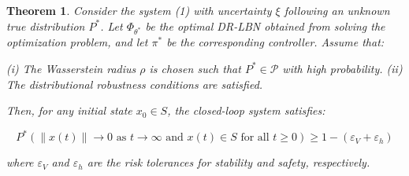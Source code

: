 \documentclass[11pt, oneside]{article}
\newtheorem{theorem}{Theorem}
\begin{document}
\setcounter{theorem}{0}
\begin{theorem}
Consider the system (1) with uncertainty $\xi$ following an unknown true distribution $P^*$. Let $\Phi_{\theta^*}$ be the optimal DR-LBN obtained from solving the optimization problem, and let $\pi^*$ be the corresponding controller. Assume that:

(i) The Wasserstein radius $\rho$ is chosen such that $P^* \in \mathcal{P}$ with high probability.
(ii) The distributional robustness conditions are satisfied.

Then, for any initial state $x_0 \in S$, the closed-loop system satisfies:

\begin{equation}
    P^*(\|x(t)\| \to 0 \text{ as } t \to \infty \text{ and } x(t) \in S \text{ for all } t \geq 0) \geq 1 - (\varepsilon_V + \varepsilon_h)
\end{equation}

where $\varepsilon_V$ and $\varepsilon_h$ are the risk tolerances for stability and safety, respectively.
\end{theorem}
\end{document}
